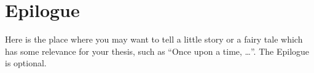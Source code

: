 \chapter*{Epilogue}
\thispagestyle{plain}

Here is the place where you may want to tell a little story or a fairy tale
which has some relevance for your thesis, such as ``Once upon a time, \dots''.
The Epilogue is optional.
